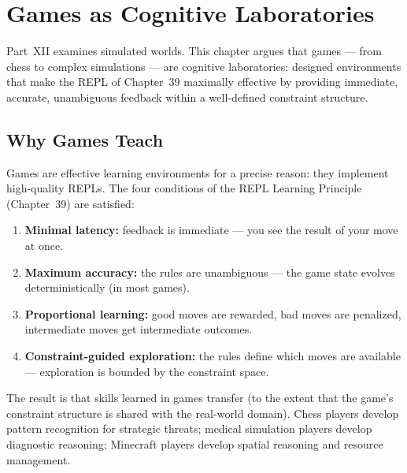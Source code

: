 \chapter{Games as Cognitive Laboratories}



Part~XII examines simulated worlds. This chapter argues that games —
from chess to complex simulations — are cognitive laboratories: designed
environments that make the REPL of Chapter~39 maximally effective by
providing immediate, accurate, unambiguous feedback within a well-defined
constraint structure.

\section{Why Games Teach}

Games are effective learning environments for a precise reason: they
implement high-quality REPLs. The four conditions of the REPL Learning
Principle (Chapter~39) are satisfied:

\begin{enumerate}
  \item \textbf{Minimal latency:} feedback is immediate — you see the
        result of your move at once.
  \item \textbf{Maximum accuracy:} the rules are unambiguous — the game
        state evolves deterministically (in most games).
  \item \textbf{Proportional learning:} good moves are rewarded,
        bad moves are penalized, intermediate moves get intermediate
        outcomes.
  \item \textbf{Constraint-guided exploration:} the rules define which
        moves are available — exploration is bounded by the constraint
        space.
\end{enumerate}

The result is that skills learned in games transfer (to the extent that
the game's constraint structure is shared with the real-world domain).
Chess players develop pattern recognition for strategic threats; medical
simulation players develop diagnostic reasoning; Minecraft players develop
spatial reasoning and resource management.

